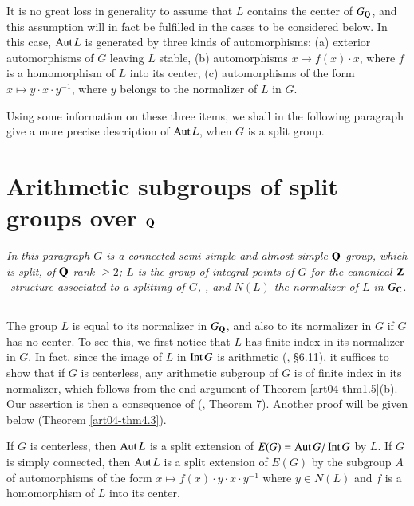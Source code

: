 \begin{remark*}
It is no great loss in generality to assume that $L$ contains the center of $G_{\mathbf{Q}}$, and this assumption will in fact be fulfilled in the cases to be considered below. In this case, $\operatorname{\mathrm{Aut}} L$ is generated by three kinds of automorphisms: (a) exterior automorphisms of $G$ leaving $L$ stable, (b) automorphisms $x\mapsto f(x)\cdot x$, where $f$ is a homomorphism of $L$ into its center, (c) automorphisms of the form $x\mapsto y\cdot x\cdot y^{-1}$, where $y$ belongs to the normalizer of $L$ in $G$.
\end{remark*}

Using some information on these three items, we shall in the following paragraph give a more precise description of $\operatorname{\mathrm{Aut}} L$, when $G$ is a split group.

\section{Arithmetic subgroups of split groups over $\mathbf{Q}$}\label{art04-sec2}

{\em In this paragraph $G$ is a connected semi-simple and almost simple $\mathbf{Q}$-group, which is split, of $\mathbf{Q}$-rank $\geq 2$; $L$ is the group of integral points of $G$ for the canonical $\mathbf{Z}$-structure associated to a splitting of $G$\cite{art04-key10}, \cite{art04-key18}, and $N(L)$ the normalizer of $L$ in $G_{\mathbf{C}}$.}

\subsection{}\label{art04-sec2.1}
The group $L$ is equal to its normalizer in $G_{\mathbf{Q}}$, and also to its normalizer in $G$ if $G$ has no center. To see this, we first notice that $L$ has finite index in its normalizer in $G$. In fact, since the image of $L$ in $\operatorname{\mathrm{Int}} G$ is arithmetic (\cite{art04-key7}, \S6.11), it suffices to show that if $G$ is centerless, any arithmetic subgroup of $G$ is of finite index in its normalizer, which follows from the end argument of Theorem \ref{art04-thm1.5}(b). Our assertion is then a consequence of (\cite{art04-key6}, Theorem 7). Another proof will be given below (Theorem \ref{art04-thm4.3}).

\setcounter{theorem}{1}
\begin{theorem}\label{art04-thm2.2}
If $G$ is centerless, then $\operatorname{\mathrm{Aut}} L$ is a split extension of $E(G)=\operatorname{\mathrm{Aut}} G/\operatorname{\mathrm{Int}} G$ by $L$. If $G$ is simply connected, then $\operatorname{\mathrm{Aut}} L$ is a split extension of $E(G)$ by the subgroup $A$ of automorphisms of the form $x\mapsto f(x)\cdot y\cdot x\cdot y^{-1}$ where $y\in N(L)$ and $f$ is a homomorphism of $L$ into its center.
\end{theorem}


